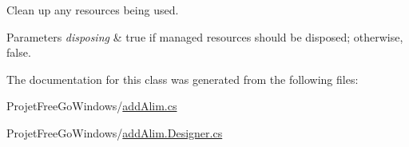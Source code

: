 Clean up any resources being used. 


\begin{DoxyParams}{Parameters}
{\em disposing} & true if managed resources should be disposed; otherwise, false.\\
\hline
\end{DoxyParams}


The documentation for this class was generated from the following files\+:\begin{DoxyCompactItemize}
\item 
Projet\+Free\+Go\+Windows/\hyperlink{add_alim_8cs}{add\+Alim.\+cs}\item 
Projet\+Free\+Go\+Windows/\hyperlink{add_alim_8_designer_8cs}{add\+Alim.\+Designer.\+cs}\end{DoxyCompactItemize}
